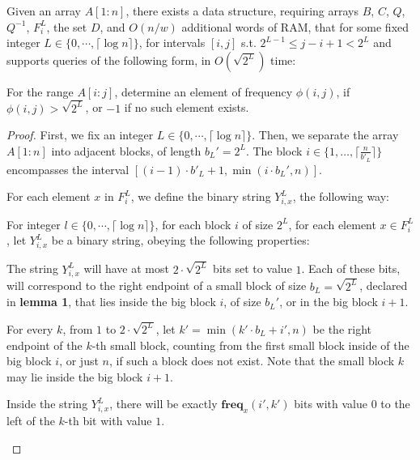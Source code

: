 \documentclass[runningheads]{llncs}
\begin{document}
\begin{lemma}
    Given an array $A[1:n]$, there exists a data structure, requiring arrays $B$, $C$, $Q$, $Q^{-1}$, $F_i^L$, the set $D$, and $ O(n/w) $ additional words of RAM, that for some fixed integer 
    $L \in \{ 0 , \cdots , \lceil  \log n \rceil \}$, for intervals $[i,j]$ s.t. $ 2^{L-1} \leq j-i+1 < 2^{L}$
    and supports queries of the following form, in $O(\sqrt{2^L})$ time:

        For the range $A[i:j]$, determine an element of frequency $\phi(i,j)$, if $\phi(i,j)>\sqrt{2^L}$, or $-1$ if no such element exists. 
\end{lemma}
\begin{proof}
    First, we fix an integer $L \in \{ 0 , \cdots , \lceil  \log n \rceil \}$.
    Then, we separate the array $A[1:n]$ into adjacent blocks, of length $b_L' = 2^L$. The block $i\in \{1,\dots, \lceil \frac{n}{b'_L} \rceil\}$ 
    encompasses the interval $[(i-1) \cdot b'_L +1, \min(i\cdot b_L' , n)]$.
    
    For each element $x$ in $F_i^L$, we define the binary string $Y_{i,x}^L$, the following way:
    \begin{definition}
        For integer $l \in \{ 0 , \cdots , \lceil \log n \rceil \}$, for each block $i$ of size $2^L$, for each element $x \in F_i^L$, let $Y_{i,x}^L$ be a binary string, obeying the following properties:
       \begin{property}
        The string $Y_{i,x}^L$ will have at most $2\cdot \sqrt{2^L}$ bits set to value $1$. Each of these bits, will correspond to the right endpoint of a small block of size $b_L=\sqrt{2^L}$, declared in \textbf{lemma 1},
         that lies inside the big block $i$, of size $b_L'$, or in the big block $i+1$.
       \end{property}

       \begin{property}
            For every $k$, from $1$ to  $2\cdot \sqrt{2^L}$, let $k'=\min(k'\cdot b_L+i', n)$ be the right endpoint of the $k$-th small block, counting from the first small block inside of the big block $i$, or just $n$, 
            if such a block does not exist. Note that the small block $k$ may lie inside the big block $i+1$.

            Inside the string $Y_{i,x}^L$, there will be exactly $\textbf{freq}_x(i',k')$ bits with value $0$ to the left of the $k$-th bit with value $1$.
        \end{property}


\end{definition}
\end{proof}
\end{document}
